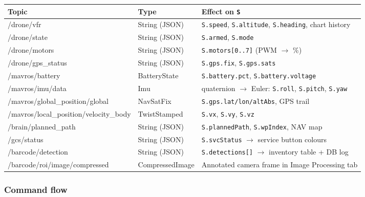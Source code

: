 \documentclass[11pt,a4paper]{article}
\begin{document}
{\footnotesize
\begin{longtable}{>{\ttfamily\raggedright\arraybackslash}p{4.6cm}
                  >{\raggedright\arraybackslash}p{2.6cm}
                  >{\raggedright\arraybackslash}p{6.4cm}}
  \toprule
  \normalfont\textbf{Topic} & \textbf{Type} & \textbf{Effect on \texttt{S}} \\
  \midrule
  /drone/vfr & String (JSON) & \texttt{S.speed}, \texttt{S.altitude}, \texttt{S.heading}, chart history \\[2pt]
  /drone/state & String (JSON) & \texttt{S.armed}, \texttt{S.mode} \\[2pt]
  /drone/motors & String (JSON) & \texttt{S.motors[0..7]} (PWM $\rightarrow$ \%) \\[2pt]
  /drone/gps\_status & String (JSON) & \texttt{S.gps.fix}, \texttt{S.gps.sats} \\[2pt]
  /mavros/battery & BatteryState & \texttt{S.battery.pct}, \texttt{S.battery.voltage} \\[2pt]
  /mavros/imu/data & Imu & quaternion $\rightarrow$ Euler: \texttt{S.roll}, \texttt{S.pitch}, \texttt{S.yaw} \\[2pt]
  /mavros/global\_position/global & NavSatFix & \texttt{S.gps.lat/lon/altAbs}, GPS trail \\[2pt]
  /mavros/local\_position/velocity\_body & TwistStamped & \texttt{S.vx}, \texttt{S.vy}, \texttt{S.vz} \\[2pt]
  /brain/planned\_path & String (JSON) & \texttt{S.plannedPath}, \texttt{S.wpIndex}, NAV map \\[2pt]
  /gcs/status & String (JSON) & \texttt{S.svcStatus} $\rightarrow$ service button colours \\[2pt]
  /barcode/detection & String (JSON) & \texttt{S.detections[]} $\rightarrow$ inventory table + DB log \\[2pt]
  /barcode/roi/image/compressed & CompressedImage & Annotated camera frame in Image Processing tab \\
  \bottomrule
\end{longtable}
}

\subsubsection{Command flow}
\end{document}
